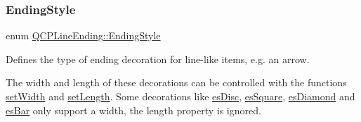 \subsubsection{\texorpdfstring{Ending\+Style}{EndingStyle}\hspace{0.1cm}{\footnotesize\ttfamily [1/2]}}
{\footnotesize\ttfamily enum \hyperlink{class_q_c_p_line_ending_a5ef16e6876b4b74959c7261d8d4c2cd5}{Q\+C\+P\+Line\+Ending\+::\+Ending\+Style}}

Defines the type of ending decoration for line-\/like items, e.\+g. an arrow.



The width and length of these decorations can be controlled with the functions \hyperlink{class_q_c_p_line_ending_a26dc020ea985a72cc25881ce2115e34e}{set\+Width} and \hyperlink{class_q_c_p_line_ending_ae36fa01763751cd64b7f56c3507e935a}{set\+Length}. Some decorations like \hyperlink{class_q_c_p_line_ending_a5ef16e6876b4b74959c7261d8d4c2cd5a4e7a48003d59b1eed00767e879440600}{es\+Disc}, \hyperlink{class_q_c_p_line_ending_a5ef16e6876b4b74959c7261d8d4c2cd5a8b0298e645008220cbc6cef9d05eb950}{es\+Square}, \hyperlink{class_q_c_p_line_ending_a5ef16e6876b4b74959c7261d8d4c2cd5a0a9e21dfaf144c9b8ae41711f61199e3}{es\+Diamond} and \hyperlink{class_q_c_p_line_ending_a5ef16e6876b4b74959c7261d8d4c2cd5a1683a6a39898f53737ee21d4fedba791}{es\+Bar} only support a width, the length property is ignored.

